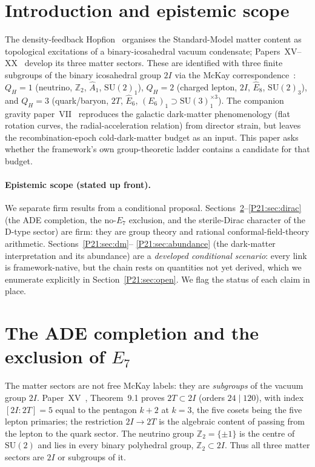 \documentclass[11pt,a4paper]{article}
\theoremstyle{definition}\newtheorem{definition}[theorem]{Definition}
\theoremstyle{remark}
\newcommand{\SU}{\mathrm{SU}}
\newcommand{\twoI}{2I}
\newcommand{\twoT}{2T}
\newcommand{\QH}{Q_H}
\newcommand{\Ztwo}{\mathbb{Z}_2}
\begin{document}
\tableofcontents

\section{Introduction and epistemic scope}
The density-feedback Hopfion~\cite{Paper1} organises the Standard-Model
matter content as topological excitations of a binary-icosahedral vacuum
condensate; Papers~XV--XX~\cite{Paper15,Paper16,Paper17,Paper18,Paper19,Paper20}
develop its three matter sectors. These are identified with
three finite subgroups of the binary icosahedral group $\twoI$ via the
McKay correspondence~\cite{CIZ1987}:
$\QH=1$ (neutrino, $\Ztwo$, $\widehat{A}_1$, $\SU(2)_1$), $\QH=2$
(charged lepton, $\twoI$, $\widehat{E}_8$, $\SU(2)_3$), and $\QH=3$
(quark/baryon, $\twoT$, $\widehat{E}_6$, $(E_6)_1\supset\SU(3)_1^{\times3}$).
The companion gravity paper~VII~\cite{Paper7} reproduces the galactic
dark-matter phenomenology (flat rotation curves, the radial-acceleration
relation) from director strain, but leaves the recombination-epoch
cold-dark-matter budget as an input. This paper asks whether the
framework's own group-theoretic ladder contains a candidate for that
budget.

\paragraph{Epistemic scope (stated up front).} We separate firm results
from a conditional proposal. Sections~\ref{P21:sec:ade}--\ref{P21:sec:dirac}
(the ADE completion, the no-$E_7$ exclusion, and the sterile-Dirac
character of the D-type sector) are firm: they are group theory and
rational conformal-field-theory arithmetic. Sections~\ref{P21:sec:dm}--%
\ref{P21:sec:abundance} (the dark-matter interpretation and its abundance)
are a \emph{developed conditional scenario}: every link is
framework-native, but the chain rests on quantities not yet derived,
which we enumerate explicitly in Section~\ref{P21:sec:open}. We flag the
status of each claim in place.

\section{The ADE completion and the exclusion of $E_7$}
\label{P21:sec:ade}
The matter sectors are not free McKay labels: they are \emph{subgroups}
of the vacuum group $\twoI$. Paper~XV~\cite{Paper15}, Theorem~9.1
proves $\twoT\subset\twoI$ (orders $24\mid120$), with index
$[\twoI:\twoT]=5$ equal to the pentagon $k+2$ at $k=3$, the five cosets
being the five lepton primaries; the restriction $\twoI\to\twoT$ is the
algebraic content of passing from the lepton to the quark sector.
The neutrino group $\Ztwo=\{\pm1\}$ is the centre of $\SU(2)$ and lies
in every binary polyhedral group, $\Ztwo\subset\twoI$. Thus all three
matter sectors are $\twoI$ or subgroups of it.
\end{document}
